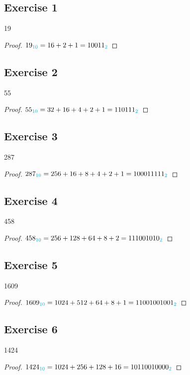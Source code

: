 \documentclass[14pt]{extarticle}
\newcommand{\base}[1]{{\color{cyan}#1}}
\begin{document}
\subsection{Exercise 1}
19

\begin{proof}
    $19_\base{10} = 16 + 2 + 1 = 10011_\base{2}$
\end{proof}

\subsection{Exercise 2}
55

\begin{proof}
    $55_\base{10} = 32 + 16 + 4 + 2 + 1 = 110111_\base{2}$
\end{proof}

\subsection{Exercise 3}
287

\begin{proof}
    $287_\base{10} = 256 + 16 + 8 + 4 + 2 + 1 = 100011111_\base{2}$
\end{proof}

\subsection{Exercise 4}
458

\begin{proof}
    $458_\base{10} = 256 + 128 + 64 + 8 + 2 = 111001010_\base{2}$
\end{proof}

\subsection{Exercise 5}
1609

\begin{proof}
    $1609_\base{10} = 1024 + 512 + 64 + 8 + 1 = 11001001001_\base{2}$
\end{proof}

\subsection{Exercise 6}
1424

\begin{proof}
    $1424_\base{10} = 1024 + 256 + 128 + 16 = 10110010000_\base{2}$
\end{proof}
\end{document}
